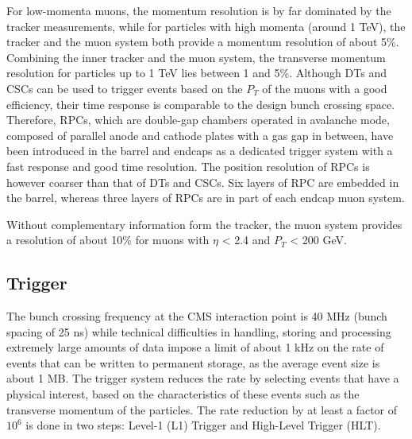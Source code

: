 For low-momenta muons, the momentum resolution is by far dominated by the tracker measurements, while for particles with high momenta (around 1 TeV), the tracker and the muon system both provide a momentum resolution of about 5\%. Combining the inner tracker and the muon system, the transverse momentum resolution for particles up to 1 TeV lies between 1 and 5\%. Although DTs and CSCs can be used to trigger events based on the $P_{T}$ of the muons with a good efficiency, their time response is comparable to the design bunch crossing space. Therefore, RPCs, which are double-gap chambers operated in avalanche mode, composed of parallel anode and cathode plates with a gas gap in between, have been introduced in the barrel and endcaps as a dedicated trigger system with a fast response and good time resolution. The position resolution of RPCs is however coarser than that of DTs and CSCs. Six layers of RPC are embedded in the barrel, whereas three layers of RPCs are in part of each endcap muon system.

Without complementary information form the tracker, the muon system provides a resolution of about 10\% for muons with $\eta$ < 2.4 and $P_{T}$ < 200 GeV.

\subsection{Trigger}\label{subsec:CMS_trigger}

The bunch crossing frequency at the CMS interaction point is 40 MHz (bunch spacing of 25 ns) while technical difficulties in handling, storing and processing extremely large amounts of data impose a limit of about 1 kHz on the rate of events that can be written to permanent storage, as the average event size is about 1 MB. The trigger system reduces the rate by selecting events that have a physical interest, based on the characteristics of these events such as the transverse momentum of the particles. The rate reduction by at least a factor of $10^{6}$ is done in two steps: Level-1 (L1) Trigger and High-Level Trigger (HLT).


